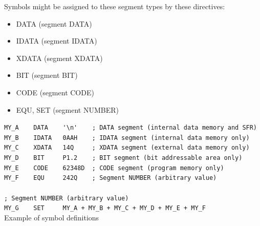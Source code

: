 \documentclass[a4paper,twoside,12pt]{book}
\newcommand{\mysmallfont}{\fontsize{8pt}{10pt} \selectfont{}}
\begin{document}
		Symbols might be assigned to these segment types by these directives:
		\begin{itemize}
			\setlength{\itemsep}{-3pt}
			\item DATA (segment DATA)
			\item IDATA (segment IDATA)
			\item XDATA (segment XDATA)
			\item BIT (segment BIT)
			\item CODE (segment CODE)
			\item EQU, SET (segment NUMBER)
		\end{itemize}
		\begin{code}[h!]
			\mysmallfont{}
			{\color{highlight_constant}\verb'MY_A'}\verb'    '{\color{highlight_directive}\verb'DATA'}\verb'    '{\color{highlight_char}\verb''\verb"'"\verb'\n'\verb"'"\verb''}\verb'    '{\color{highlight_comment}\verb'; DATA segment (internal data memory and SFR)'}\\
			{\color{highlight_constant}\verb'MY_B'}\verb'    '{\color{highlight_directive}\verb'IDATA'}\verb'   '{\color{highlight_hex}\verb'0AAH'}\verb'    '{\color{highlight_comment}\verb'; IDATA segment (internal data memory only)'}\\
			{\color{highlight_constant}\verb'MY_C'}\verb'    '{\color{highlight_directive}\verb'XDATA'}\verb'   '{\color{highlight_oct}\verb'14Q'}\verb'     '{\color{highlight_comment}\verb'; XDATA segment (external data memory only)'}\\
			{\color{highlight_constant}\verb'MY_D'}\verb'    '{\color{highlight_directive}\verb'BIT'}\verb'     '{\color{highlight_sfr}\verb'P1'}{\color{highlight_symbol}\verb'.'}{\color{highlight_unknown_base}\verb'2'}\verb'    '{\color{highlight_comment}\verb'; BIT segment (bit addressable area only)'}\\
			{\color{highlight_constant}\verb'MY_E'}\verb'    '{\color{highlight_directive}\verb'CODE'}\verb'    '{\color{highlight_dec}\verb'62348D'}\verb'  '{\color{highlight_comment}\verb'; CODE segment (program memory only)'}\\
			{\color{highlight_constant}\verb'MY_F'}\verb'    '{\color{highlight_directive}\verb'EQU'}\verb'     '{\color{highlight_oct}\verb'242Q'}\verb'    '{\color{highlight_comment}\verb'; Segment NUMBER (arbitrary value)'}\\
			\verb''\\
			{\color{highlight_comment}\verb'; Segment NUMBER (arbitrary value)'}\\
			{\color{highlight_constant}\verb'MY_G'}\verb'    '{\color{highlight_directive}\verb'SET'}\verb'     '{\color{highlight_constant}\verb'MY_A'}\verb' '{\color{highlight_symbol}\verb'+'}\verb' '{\color{highlight_constant}\verb'MY_B'}\verb' '{\color{highlight_symbol}\verb'+'}\verb' '{\color{highlight_constant}\verb'MY_C'}\verb' '{\color{highlight_symbol}\verb'+'}\verb' '{\color{highlight_constant}\verb'MY_D'}\verb' '{\color{highlight_symbol}\verb'+'}\verb' '{\color{highlight_constant}\verb'MY_E'}\verb' '{\color{highlight_symbol}\verb'+'}\verb' '{\color{highlight_constant}\verb'MY_F'}\\
			\caption{Example of symbol definitions}
		\end{code}
\end{document}
